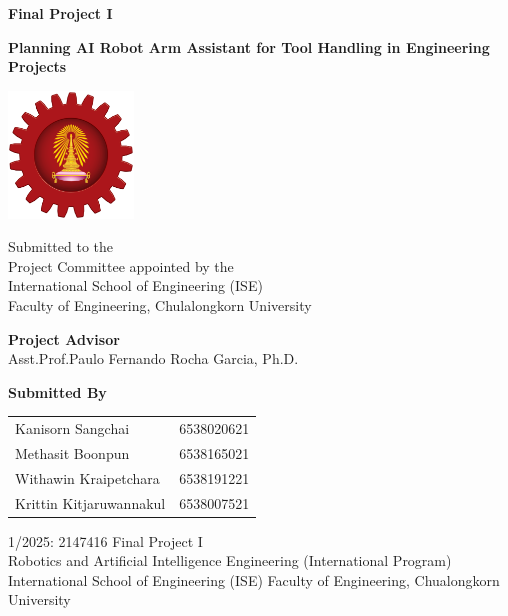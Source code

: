 \documentclass[12pt]{extarticle}
\begin{document}
\begin{titlepage}
    \centering
    {\Large \textbf{Final Project I}\par}
    \vspace{1cm}
        
    {\Large \textbf{Planning AI Robot Arm Assistant for Tool Handling in Engineering Projects}\par}
    \vspace{1cm}
    
    \includegraphics[width=0.25\textwidth]{cu_eng}\par\vspace{1cm}

    Submitted to the\\
    Project Committee appointed by the\\
    International School of Engineering (ISE)\\
    Faculty of Engineering, Chulalongkorn University
    \vspace{1cm}
    
    {\large \textbf{Project Advisor}} \\
    Asst.Prof.Paulo Fernando Rocha Garcia, Ph.D.
    \vspace{1cm}
    
    {\large \textbf{Submitted By}} \\
    \begin{tabular}{l l}
    Kanisorn Sangchai   & 6538020621 \\
    Methasit Boonpun    & 6538165021 \\
    Withawin Kraipetchara & 6538191221 \\
    Krittin Kitjaruwannakul & 6538007521 \\
    \end{tabular}
    \vspace{1cm}
    
    1/2025: 2147416 Final Project I\\
Robotics and Artificial Intelligence Engineering (International Program)\\
International School of Engineering (ISE) Faculty of Engineering, Chualongkorn University

\end{titlepage}
\end{document}
